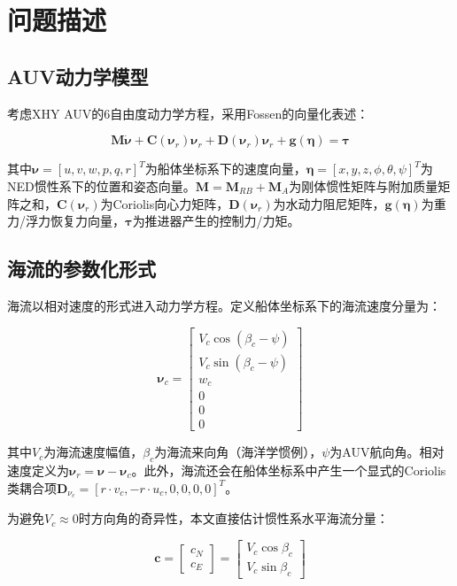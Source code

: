 \section{问题描述}

\subsection{AUV动力学模型}

考虑XHY AUV的6自由度动力学方程，采用Fossen的向量化表述\cite{fossen2011handbook}：

\begin{equation}
    \bm{M}\dot{\bm{\nu}} + \bm{C}(\bm{\nu}_r)\bm{\nu}_r + \bm{D}(\bm{\nu}_r)\bm{\nu}_r + \bm{g}(\bm{\eta}) = \bm{\tau}
    \label{eq:dynamics}
\end{equation}

其中$\bm{\nu}=[u,v,w,p,q,r]^T$为船体坐标系下的速度向量，$\bm{\eta}=[x,y,z,\phi,\theta,\psi]^T$为NED惯性系下的位置和姿态向量。$\bm{M}=\bm{M}_{RB}+\bm{M}_A$为刚体惯性矩阵与附加质量矩阵之和，$\bm{C}(\bm{\nu}_r)$为Coriolis向心力矩阵，$\bm{D}(\bm{\nu}_r)$为水动力阻尼矩阵，$\bm{g}(\bm{\eta})$为重力/浮力恢复力向量，$\bm{\tau}$为推进器产生的控制力/力矩。

\subsection{海流的参数化形式}

海流以相对速度的形式进入动力学方程。定义船体坐标系下的海流速度分量为：

\begin{equation}
    \bm{\nu}_c = \begin{bmatrix}
        V_c\cos(\beta_c-\psi) \\ V_c\sin(\beta_c-\psi) \\ w_c \\ 0 \\ 0 \\ 0
    \end{bmatrix}
    \label{eq:nuc}
\end{equation}

其中$V_c$为海流速度幅值，$\beta_c$为海流来向角（海洋学惯例），$\psi$为AUV航向角。相对速度定义为$\bm{\nu}_r = \bm{\nu} - \bm{\nu}_c$。此外，海流还会在船体坐标系中产生一个显式的Coriolis类耦合项$\bm{D}_{\nu_c} = [r\cdot v_c, -r\cdot u_c, 0, 0, 0, 0]^T$。

为避免$V_c\approx 0$时方向角的奇异性，本文直接估计惯性系水平海流分量：

\begin{equation}
    \bm{c} = \begin{bmatrix} c_N \\ c_E \end{bmatrix} = \begin{bmatrix} V_c\cos\beta_c \\ V_c\sin\beta_c \end{bmatrix}
    \label{eq:c_inertial}
\end{equation}

